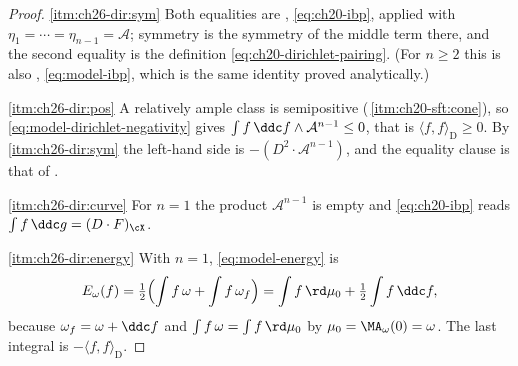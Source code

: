\begin{proof}
\cref{itm:ch26-dir:sym}  Both equalities are
, \eqref{eq:ch20-ibp}, applied with
\(\eta_1=\cdots=\eta_{n-1}=\mathcal A\); symmetry is the symmetry of the
middle term there, and the second equality is the definition
\eqref{eq:ch20-dirichlet-pairing}.  (For \(n\geq2\) this is also
, \eqref{eq:model-ibp}, which is the
same identity proved analytically.)

\cref{itm:ch26-dir:pos}  A relatively ample class is semipositive
(\,\cref{itm:ch20-sft:cone}), so
\eqref{eq:model-dirichlet-negativity} gives
\(\int f\,\ddc f\wedge\mathcal A^{n-1}\leq0\), that is
\(\langle f,f\rangle_{\mathrm D}\geq0\).  By
\cref{itm:ch26-dir:sym} the left-hand side is
\(-(D^2\cdot\mathcal A^{n-1})\), and the equality clause is that of
.

\cref{itm:ch26-dir:curve}  For \(n=1\) the product
\(\mathcal A^{n-1}\) is empty and \eqref{eq:ch20-ibp} reads
\(\int f\,\ddc g=(D\cdot F)_{\cX}\).

\cref{itm:ch26-dir:energy}  With \(n=1\), \eqref{eq:model-energy} is
\[
 E_\omega(f)=\tfrac12\Bigl(\int f\,\omega+\int f\,\omega_f\Bigr)
 =\int f\,\rd\mu_0+\tfrac12\int f\,\ddc f ,
\]
because \(\omega_f=\omega+\ddc f\) and \(\int f\,\omega=\int f\,\rd\mu_0\) by
\(\mu_0=\MA_\omega(0)=\omega\).  The last integral is
\(-\langle f,f\rangle_{\mathrm D}\).
\end{proof}


